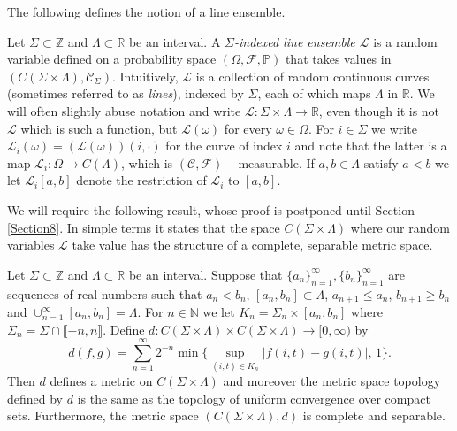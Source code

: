 The following defines the notion of a line ensemble.
\begin{definition}\label{CLEDef}
Let $\Sigma \subset \mathbb{Z}$ and $\Lambda \subset \mathbb{R}$ be an interval. A {\em $\Sigma$-indexed line ensemble $\mathcal{L}$} is a random variable defined on a probability space $(\Omega, \mathcal{F}, \mathbb{P})$ that takes values in $\left(C (\Sigma \times \Lambda), \mathcal{C}_{\Sigma}\right)$. Intuitively, $\mathcal{L}$ is a collection of random continuous curves (sometimes referred to as {\em lines}), indexed by $\Sigma$,  each of which maps $\Lambda$ in $\mathbb{R}$. We will often slightly abuse notation and write $\mathcal{L}: \Sigma \times \Lambda \rightarrow \mathbb{R}$, even though it is not $\mathcal{L}$ which is such a function, but $\mathcal{L}(\omega)$ for every $\omega \in \Omega$. For $i \in \Sigma$ we write $\mathcal{L}_i(\omega) = (\mathcal{L}(\omega))(i, \cdot)$ for the curve of index $i$ and note that the latter is a map $\mathcal{L}_i: \Omega \rightarrow C(\Lambda)$, which is $(\mathcal{C}, \mathcal{F})-$measurable. If $a,b \in \Lambda$ satisfy $a < b$ we let $\mathcal{L}_i[a,b]$ denote the restriction of $\mathcal{L}_i$ to $[a,b]$.
\end{definition}

We will require the following result, whose proof is postponed until Section \ref{Section8}. In simple terms it states that the space $C (\Sigma \times \Lambda)$ where our random variables $\mathcal{L}$ take value has the structure of a complete, separable metric space. 

\begin{lemma}\label{Polish} Let $\Sigma \subset \mathbb{Z}$ and $\Lambda \subset \mathbb{R}$ be an interval. Suppose that $\{a_n\}_{n = 1}^\infty, \{b_n\}_{n = 1}^\infty$ are sequences of real numbers such that $a_n < b_n$, $[a_n, b_n] \subset \Lambda$, $a_{n+1} \leq a_n$, $b_{n+1} \geq b_n$ and $\cup_{n = 1}^\infty [a_n, b_n] = \Lambda$. For $n \in \mathbb{N}$ we let $K_n = \Sigma_n \times [a_n, b_n]$ where $\Sigma_n = \Sigma \cap \llbracket -n, n \rrbracket$. Define $d: C (\Sigma \times \Lambda) \times C (\Sigma \times \Lambda) \rightarrow [0, \infty)$ by
\begin{equation} d (f,g) = \sum_{n=1}^\infty 2^{-n}\min\Big\{\sup_{(i,t)\in K_n} |f(i,t) - g(i,t)|, \, 1\Big\}.
\end{equation}
Then $d$ defines a metric on $C (\Sigma \times \Lambda) $ and moreover the metric space topology defined by $d$ is the same as the topology of uniform convergence over compact sets. Furthermore, the metric space $(C (\Sigma \times \Lambda), d)$ is complete and separable.
\end{lemma}


